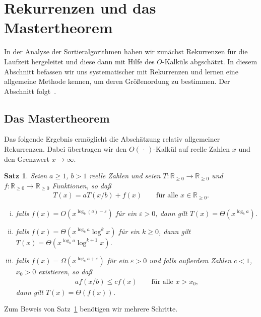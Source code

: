 \documentclass[10pt,reqno]{amsart}
\numberwithin{equation}{section}
\newcommand\nix{\,\cdot\,}
\newcommand\RRpos{\mathbb R_{\geq0}}
\newtheorem{theorem}[definition]{Satz}
\newcommand\eps{\varepsilon}
\newcommand\Thm{Satz}
\begin{document}
\section{Rekurrenzen und das Mastertheorem}\label{sec_rec}

In der Analyse der Sortieralgorithmen haben wir zun\"achst Rekurrenzen f\"ur die Laufzeit hergeleitet und diese dann mit Hilfe des $O$-Kalk\"uls abgsch\"atzt.
In diesem Abschnitt befassen wir uns systematischer mit Rekurrenzen und lernen eine allgemeine Methode kennen, um deren Gr\"o\ss enordung zu bestimmen.
Der Abschnitt folgt~\cite{Cormen}.

\subsection{Das Mastertheorem}\label{sec_master}
Das folgende Ergebnis erm\"oglicht die Absch\"atzung relativ allgemeiner Rekurrenzen.
Dabei \"ubertragen wir den $O(\nix)$-Kalk\"ul auf reelle Zahlen $x$ und den Grenzwert $x\to\infty$.

\begin{theorem}\label{thm_master}
	Seien $a\geq1$, $b>1$ reelle Zahlen und seien $T:\RRpos\to\RRpos$ und $f:\RRpos\to\RRpos$ Funktionen, so da\ss
	\begin{align*}
		T(x)=aT(x/b)+f(x)\qquad\mbox{f\"ur alle }x\in\RRpos.
	\end{align*}
	\begin{enumerate}[(i)]
		\item falls $f(x)=O(x^{\log_b(a)-\eps})$ f\"ur ein $\eps>0$, dann gilt $T(x)=\Theta(x^{\log_ba})$.
		\item falls $f(x)=\Theta(x^{\log_ba}\log^kx)$ f\"ur ein $k\geq0$, dann gilt $T(x)=\Theta(x^{\log_ba}\log^{k+1}x)$.
		\item falls $f(x)=\Omega(x^{\log_ba+\eps})$ f\"ur ein $\eps>0$ und falls au\ss erdem  Zahlen $c<1$, $x_0>0$ existieren, so da\ss
			\begin{align*}
				af(x/b)\leq cf(x)\qquad\mbox{f\"ur alle }x>x_0,
			\end{align*}
			dann gilt $T(x)=\Theta(f(x))$.
	\end{enumerate}
\end{theorem}

Zum Beweis von \Thm~\ref{thm_master} ben\"otigen wir mehrere Schritte.
\end{document}
